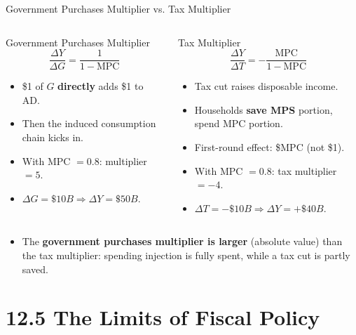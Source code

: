 \documentclass[aspectratio=169]{beamer}
\begin{document}
\begin{frame}{Government Purchases Multiplier vs. Tax Multiplier}
\transfade
\begin{columns}
\begin{block}{\textcolor{accent}{Government Purchases Multiplier}}
\[
  \frac{\Delta Y}{\Delta G} = \frac{1}{1-\text{MPC}}
\]
\begin{itemize}
  \item \$1 of $G$ \textbf{directly} adds \$1 to AD.
  \item Then the induced consumption chain kicks in.
  \item With MPC $= 0.8$: multiplier $= 5$.
  \item $\Delta G = \$10B \Rightarrow \Delta Y = \$50B$.
\end{itemize}
\end{block}
\begin{block}{\textcolor{canadared}{Tax Multiplier}}
\[
  \frac{\Delta Y}{\Delta T} = -\frac{\text{MPC}}{1-\text{MPC}}
\]
\begin{itemize}
  \item Tax cut raises disposable income.
  \item Households \textbf{save MPS} portion, spend MPC portion.
  \item First-round effect: \$MPC (not \$1).
  \item With MPC $= 0.8$: tax multiplier $= -4$.
  \item $\Delta T = -\$10B \Rightarrow \Delta Y = +\$40B$.
\end{itemize}
\end{block}
\end{columns}
\vspace{0.4em}
\begin{itemize}[<+->]
  \item The \textbf{government purchases multiplier is larger} (absolute value) than the tax multiplier: spending injection is fully spent, while a tax cut is partly saved.
\end{itemize}
\end{frame}

\section{12.5 The Limits of Fiscal Policy}
\end{document}
